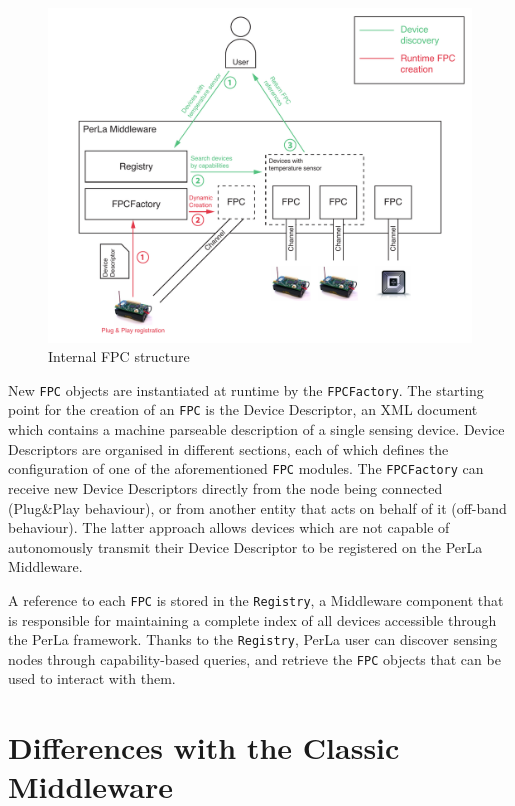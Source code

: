 \begin{figure}[h!]
\includegraphics[width=\textwidth]{imgs/middleware_overview.pdf}
\caption{Internal FPC structure}
\label{fig:fpc_overview}
\end{figure}

New \texttt{FPC} objects are instantiated at runtime by the
\texttt{FPCFactory}. The starting point for the creation of an \texttt{FPC} is
the Device Descriptor, an XML document which contains a machine parseable
description of a single sensing device. Device Descriptors are organised in
different sections, each of which defines the configuration of one of the
aforementioned \texttt{FPC} modules. The \texttt{FPCFactory} can receive new
Device Descriptors directly from the node being connected (Plug\&Play
behaviour), or from another entity that acts on behalf of it (off-band
behaviour). The latter approach allows devices which are not capable of
autonomously transmit their Device Descriptor to be registered on the PerLa
Middleware.

A reference to each \texttt{FPC} is stored in the \texttt{Registry}, a
Middleware component that is responsible for maintaining a complete index of
all devices accessible through the PerLa framework. Thanks to the
\texttt{Registry}, PerLa user can discover sensing nodes through
capability-based queries, and retrieve the \texttt{FPC} objects that can be
used to interact with them.


\section{Differences with the Classic Middleware}

